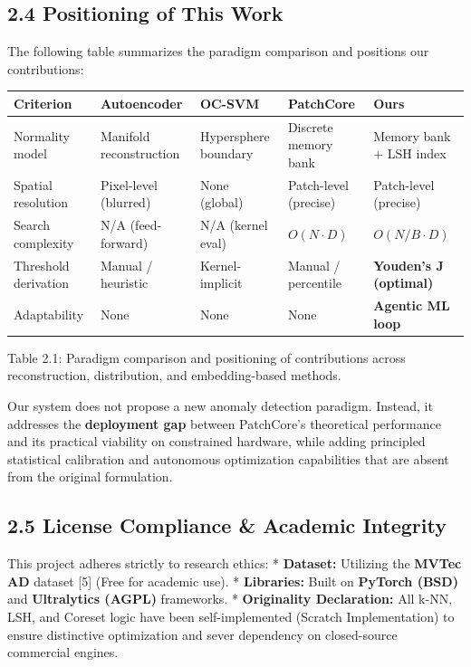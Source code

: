 \documentclass[12pt, a4paper, oneside]{report}
\begin{document}
\subsection{2.4 Positioning of This Work}\label{positioning-of-this-work}

The following table summarizes the paradigm comparison and positions our contributions:

{\def\LTcaptype{none} %
\begin{longtable}[]{@{}lllll@{}}
\toprule\noalign{}
Criterion & Autoencoder & OC-SVM & PatchCore & \textbf{Ours} \\
\midrule\noalign{}
\endhead
\bottomrule\noalign{}
\endlastfoot
Normality model & Manifold reconstruction & Hypersphere boundary & Discrete memory bank & Memory bank + LSH index \\
Spatial resolution & Pixel-level (blurred) & None (global) & Patch-level (precise) & Patch-level (precise) \\
Search complexity & N/A (feed-forward) & N/A (kernel eval) & \(O(N \cdot D)\) & \textbf{\(O(N/B \cdot D)\)} \\
Threshold derivation & Manual / heuristic & Kernel-implicit & Manual / percentile & \textbf{Youden's J (optimal)} \\
Adaptability & None & None & None & \textbf{Agentic ML loop} \\
\end{longtable}
}

Table 2.1: Paradigm comparison and positioning of contributions across reconstruction, distribution, and embedding-based methods.

Our system does not propose a new anomaly detection paradigm. Instead, it addresses the \textbf{deployment gap} between PatchCore's theoretical performance and its practical viability on constrained hardware, while adding principled statistical calibration and autonomous optimization capabilities that are absent from the original formulation.

\bigskip\noindent\hrulefill\bigskip

\subsection{2.5 License Compliance \& Academic Integrity}\label{license-compliance-academic-integrity}

This project adheres strictly to research ethics: * \textbf{Dataset:} Utilizing the \textbf{MVTec AD} dataset {[}5{]} (Free for academic use). * \textbf{Libraries:} Built on \textbf{PyTorch (BSD)} and \textbf{Ultralytics (AGPL)} frameworks. * \textbf{Originality Declaration:} All k-NN, LSH, and Coreset logic have been self-implemented (Scratch Implementation) to ensure distinctive optimization and sever dependency on closed-source commercial engines.
\end{document}
